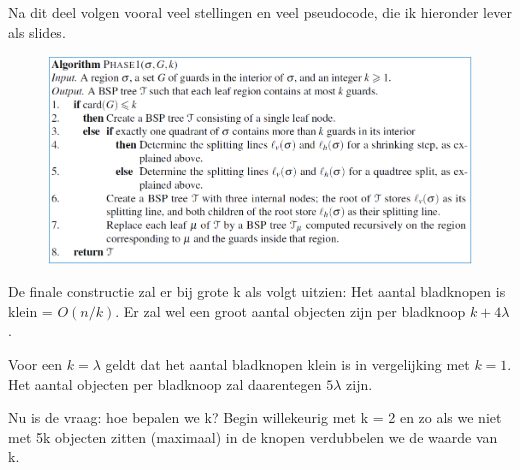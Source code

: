 \documentclass[12pt,a4paper]{article}
\begin{document}
	Na dit deel volgen vooral veel stellingen en veel pseudocode, die ik hieronder lever als slides. 
	\begin{figure}[H]
		\centering
		\includegraphics[width=0.7\linewidth]{afbeeldingen/BSP-bomen/phase1}
		\label{fig:phase1}
	\end{figure}
	\begin{figure}[H]
		\centering
		\label{fig:BSP-phaselemma}
	\end{figure}
	De finale constructie zal er bij grote k als volgt uitzien: Het aantal bladknopen is klein = $O(n/k)$. Er zal wel een groot aantal objecten zijn per bladknoop $k+4\lambda$.
	
	Voor een $k = \lambda$ geldt dat het aantal bladknopen klein is in vergelijking met $k=1$. Het aantal objecten per bladknoop zal daarentegen $5\lambda$ zijn. 
	
	Nu is de vraag: hoe bepalen we k? Begin willekeurig met k = 2 en zo als we niet met 5k objecten zitten (maximaal) in de knopen verdubbelen we de waarde van k. 
	
	\begin{figure}[H]
		\centering
		\label{fig:fcking-labels}
	\end{figure}
	
\end{document}
